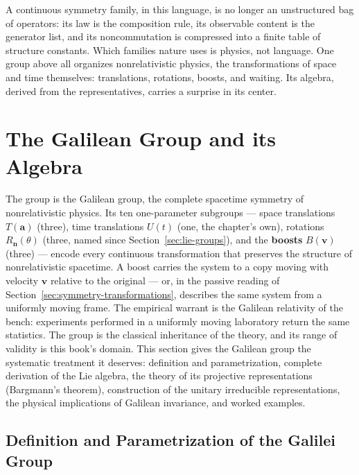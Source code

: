 A continuous symmetry family, in this language, is no longer an unstructured bag of operators: its law is the composition rule, its observable content is the generator list, and its noncommutation is compressed into a finite table of structure constants. Which families nature uses is physics, not language. One group above all organizes nonrelativistic physics, the transformations of space and time themselves: translations, rotations, boosts, and waiting. Its algebra, derived from the representatives, carries a surprise in its center.

\section{The Galilean Group and its Algebra}
\label{sec:galilean-group}

The group is the Galilean group, the complete spacetime symmetry of nonrelativistic physics. Its ten one-parameter subgroups --- space translations $T(\bm a)$ (three), time translations $U(t)$ (one, the chapter's own), rotations $R_{\bm n}(\theta)$ (three, named since Section~\ref{sec:lie-groups}), and the \textbf{boosts} $B(\bm v)$ (three) --- encode every continuous transformation that preserves the structure of nonrelativistic spacetime. A boost carries the system to a copy moving with velocity $\bm v$ relative to the original --- or, in the passive reading of Section~\ref{sec:symmetry-transformations}, describes the same system from a uniformly moving frame. The empirical warrant is the Galilean relativity of the bench: experiments performed in a uniformly moving laboratory return the same statistics. The group is the classical inheritance of the theory, and its range of validity is this book's domain. This section gives the Galilean group the systematic treatment it deserves: definition and parametrization, complete derivation of the Lie algebra, the theory of its projective representations (Bargmann's theorem), construction of the unitary irreducible representations, the physical implications of Galilean invariance, and worked examples.

\subsection{Definition and Parametrization of the Galilei Group}

